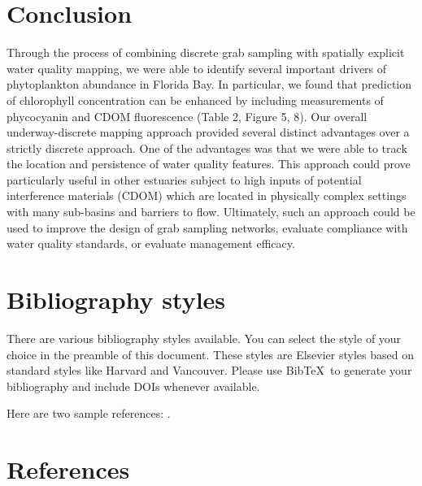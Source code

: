 \documentclass[review]{elsarticle}
\begin{document}
\section{Conclusion}

Through the process of combining discrete grab sampling with spatially explicit water quality mapping, we were able to identify several important drivers of phytoplankton abundance in Florida Bay. In particular, we found that prediction of chlorophyll concentration can be enhanced by including measurements of phycocyanin and CDOM fluorescence (Table 2, Figure 5, 8). Our overall underway-discrete mapping approach provided several distinct advantages over a strictly discrete approach. One of the advantages was that we were able to track the location and persistence of water quality features. This approach could prove particularly useful in other estuaries subject to high inputs of potential interference materials (CDOM) which are located in physically complex settings with many sub-basins and barriers to flow. Ultimately, such an approach could be used to improve the design of grab sampling networks, evaluate compliance with water quality standards, or evaluate management efficacy.

  \section{Bibliography styles}
  
  There are various bibliography styles available. You can select the style of your choice in the preamble of this document. These styles are Elsevier styles based on standard styles like Harvard and Vancouver. Please use Bib\TeX\ to generate your bibliography and include DOIs whenever available.
  
  Here are two sample references: \cite{glibert_florida_2009}.
  
  \section*{References}
  
  
  
  
\end{document}
